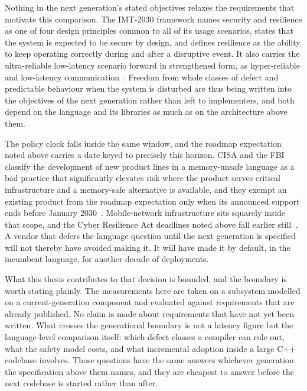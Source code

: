 \documentclass[english,oneside,a4paper,censored,csm,software-track-2020]{HYthesisML}
\begin{document}
Nothing in the next generation's stated objectives relaxes the requirements that motivate this
comparison. The IMT-2030 framework names security and resilience as one of four design principles common to
all of its usage scenarios, states that the system is expected to be secure by design, and
defines resilience as the ability to keep operating correctly during and after a disruptive
event. It also carries the ultra-reliable low-latency scenario forward in strengthened form, as
hyper-reliable and low-latency communication~\cite{itu2023imt2030}. Freedom from whole classes of
defect and predictable behaviour when the system is disturbed are thus being written into the
objectives of the next generation rather than left to implementers, and both depend on the
language and its libraries as much as on the architecture above them.

The policy clock falls inside the same window, and the roadmap expectation noted above carries a
date keyed to precisely this horizon. CISA and the FBI classify the development of new product
lines in a memory-unsafe language as a bad practice that significantly elevates risk where the
product serves critical infrastructure and a memory-safe alternative is available, and they
exempt an existing product from the roadmap expectation only when its announced support ends
before January 2030~\cite{cisa2025badpractices}. Mobile-network infrastructure sits squarely
inside that scope, and the Cyber Resilience Act deadlines noted above fall earlier
still~\cite{eu2024cra}. A vendor that defers the language question until the next generation is
specified will not thereby have avoided making it. It will have made it by default, in the
incumbent language, for another decade of deployments.

What this thesis contributes to that decision is bounded, and the boundary is worth stating
plainly. The measurements here are taken on a subsystem modelled on a current-generation
component and evaluated against requirements that are already published. No claim is made about
requirements that have not yet been written. What crosses the generational boundary is not a
latency figure but the language-level comparison itself: which defect classes a compiler can rule
out, what the safety model costs, and what incremental adoption inside a large C++ codebase
involves. Those questions have the same answers whichever generation the specification above them
names, and they are cheapest to answer before the next codebase is started rather than after.
\end{document}
